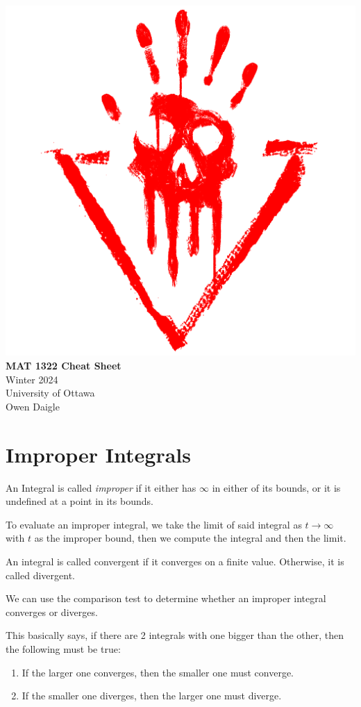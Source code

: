 \documentclass[12pt,letterpaper]{article} \usepackage{amsmath} \usepackage{graphicx}  \usepackage{longtable}  \usepackage{amssymb}
\begin{document}
    \thispagestyle{empty}
    \begin{center}
        \includegraphics[width=0.12\linewidth]{abs.png}\\
        \vspace{2em}
        \Large\textbf{MAT 1322 Cheat Sheet} \\
        \vspace{0.5em}
        \small{Winter 2024} \\
        \small{University of Ottawa} \\
        \small{Owen Daigle}
    \end{center}

    \pagebreak

    \begin{spacing}{0}
    \tableofcontents
    \end{spacing}

    \pagebreak
    

    \section{Improper Integrals}
    An Integral is called \emph{improper} if it either has $\infty$ in either of its bounds, or it is undefined at a point in its bounds. 

    To evaluate an improper integral, we take the limit of said integral as $t\to\infty$ with $t$ as the improper bound, then we compute the integral and then the limit. 

    An integral is called convergent if it converges on a finite value. Otherwise, it is called divergent. 

    We can use the comparison test to determine whether an improper integral converges or diverges. 
    
    This basically says, if there are 2 integrals with one bigger than the other, then the following must be true:
    \begin{enumerate}
        \item If the larger one converges, then the smaller one must converge. 
        \item If the smaller one diverges, then the larger one must diverge. 
    \end{enumerate}
\end{document}
